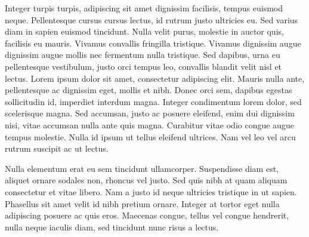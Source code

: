 \documentclass[11pt]{article}
\begin{document}
Integer turpis turpis, adipiscing sit amet dignissim facilisis, tempus euismod neque. Pellentesque cursus cursus lectus, id rutrum justo ultricies eu. Sed varius diam in sapien euismod tincidunt. Nulla velit purus, molestie in auctor quis, facilisis eu mauris. Vivamus convallis fringilla tristique. Vivamus dignissim augue dignissim augue mollis nec fermentum nulla tristique. Sed dapibus, urna eu pellentesque vestibulum, justo orci tempus leo, convallis blandit velit nisl et lectus. Lorem ipsum dolor sit amet, consectetur adipiscing elit. Mauris nulla ante, pellentesque ac dignissim eget, mollis et nibh. Donec orci sem, dapibus egestas sollicitudin id, imperdiet interdum magna. Integer condimentum lorem dolor, sed scelerisque magna. Sed accumsan, justo ac posuere eleifend, enim dui dignissim nisi, vitae accumsan nulla ante quis magna. Curabitur vitae odio congue augue tempus molestie. Nulla id ipsum ut tellus eleifend ultrices. Nam vel leo vel arcu rutrum suscipit ac ut lectus.

Nulla elementum erat eu sem tincidunt ullamcorper. Suspendisse diam est, aliquet ornare sodales non, rhoncus vel justo. Sed quis nibh at quam aliquam consectetur et vitae libero. Nam a justo id neque ultricies tristique in ut sapien. Phasellus sit amet velit id nibh pretium ornare. Integer at tortor eget nulla adipiscing posuere ac quis eros. Maecenas congue, tellus vel congue hendrerit, nulla neque iaculis diam, sed tincidunt nunc risus a lectus.

\end{document}
